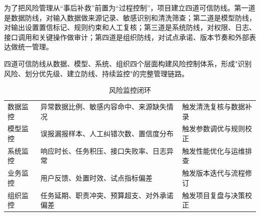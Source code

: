 为了把风险管理从“事后补救”前置为“过程控制”，项目建立四道可信防线。第一道是数据防线，对输入数据做来源记录、敏感识别和清洗筛查；第二道是模型防线，对输出设置置信标记、规则约束和人工复核；第三道是系统防线，对权限、日志、接口调用和关键操作做审计；第四道是组织防线，对试点承诺、版本节奏和外部表达做统一管理。


四道可信防线从数据、模型、系统、组织四个层面构建风险控制体系，形成"识别风险、划分优先级、建立防线、持续监控"的完整管理链路。


\begin{table}[htbp]
	\centering
	\caption{风险监控闭环}
	\begin{tabularx}{\textwidth}{L{3cm}YL{2.8cm}}
		\toprule
		 &         &  \\
		\midrule
		数据监控           & 异常数据比例、敏感内容命中、来源缺失情况  & 触发清洗复核与数据补录    \\
		模型监控           & 误报漏报样本、人工纠错次数、置信度分布   & 触发参数调优与规则校正    \\
		系统监控           & 响应时长、任务积压、接口失败率、日志异常  & 触发性能优化与运维排查    \\
		业务监控           & 用户反馈、处置时效、试点指标偏差      & 触发版本迭代与流程修订    \\
		组织监控           & 任务延期、职责冲突、预算超支、对外承诺偏差 & 触发项目复盘与决策校正    \\
		\bottomrule
	\end{tabularx}
\end{table}
